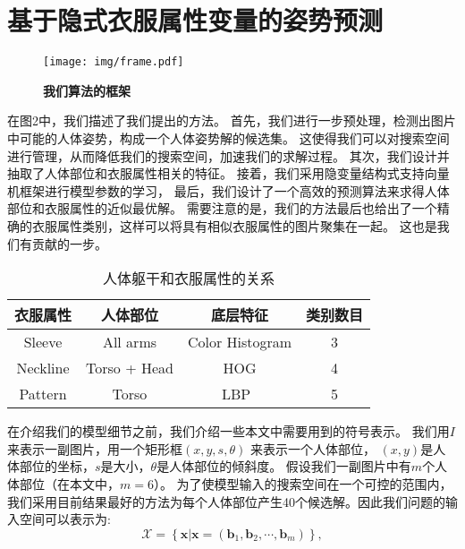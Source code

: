 
\chapter{基于隐式衣服属性变量的姿势预测}
\label{chap:model}

\begin{figure}[tbp]
\centering
\texttt{[image: img/frame.pdf]}
\caption{ \textbf{我们算法的框架} }
\label{fig:frame}
\end{figure}

在图2中，我们描述了我们提出的方法。
首先，我们进行一步预处理，检测出图片中可能的人体姿势，构成一个人体姿势解的候选集。
这使得我们可以对搜索空间进行管理，从而降低我们的搜索空间，加速我们的求解过程。
其次，我们设计并抽取了人体部位和衣服属性相关的特征。
接着，我们采用隐变量结构式支持向量机框架进行模型参数的学习，
最后，我们设计了一个高效的预测算法来求得人体部位和衣服属性的近似最优解。
需要注意的是，我们的方法最后也给出了一个精确的衣服属性类别，这样可以将具有相似衣服属性的图片聚集在一起。
这也是我们有贡献的一步。


\begin{table}
\label{tb:attr}
\centering
\caption{人体躯干和衣服属性的关系}
\begin{tabular}{|c|c|c|c|} \hline
衣服属性& 人体部位& 底层特征& 类别数目\\ \hline
Sleeve &  All arms & Color Histogram & 3 \\ \hline
Neckline & Torso + Head & HOG & 4\\ \hline
 Pattern & Torso & LBP~\cite{lbp} & 5\\ \hline
\end{tabular}
\label{tb:attr}
\end{table}

在介绍我们的模型细节之前，我们介绍一些本文中需要用到的符号表示。
我们用$I$来表示一副图片，用一个矩形框$(x, y, s, \theta)$ 来表示一个人体部位，
$(x, y)$是人体部位的坐标，$s$是大小，$\theta$是人体部位的倾斜度。
假设我们一副图片中有$m$个人体部位（在本文中，$m = 6$）。
为了使模型输入的搜索空间在一个可控的范围内，我们采用目前结果最好的方法为每个人体部位产生40个候选解。因此我们问题的输入空间可以表示为:
\begin{equation}
    \mathcal{X} = \left\{ \mathbf{x}|\mathbf{x} = ( \mathbf{b}_1, \mathbf{b}_2, \cdots, \mathbf{b}_m ) \right\},
\end{equation}

